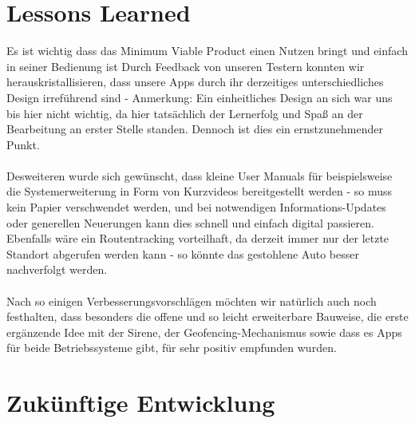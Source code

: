 \section{Lessons Learned}
Es ist wichtig dass das Minimum Viable Product einen Nutzen bringt und einfach in seiner Bedienung ist\cite{Full2022}
Durch Feedback von unseren Testern konnten wir herauskristallisieren, dass unsere Apps durch ihr derzeitiges unterschiedliches Design irreführend sind - Anmerkung: Ein einheitliches Design an sich war uns bis hier nicht wichtig, da hier tatsächlich der Lernerfolg und Spaß an der Bearbeitung an erster Stelle standen. Dennoch ist dies ein ernstzunehmender Punkt.
\\
\\
Desweiteren wurde sich gewünscht, dass kleine User Manuals für beispielsweise die Systemerweiterung in Form von Kurzvideos bereitgestellt werden - so muss kein Papier verschwendet werden, und bei notwendigen Informations-Updates oder generellen Neuerungen kann dies schnell und einfach digital passieren. Ebenfalls wäre ein Routentracking vorteilhaft, da derzeit immer nur der letzte Standort abgerufen werden kann - so könnte das gestohlene Auto besser nachverfolgt werden. 
\\
\\
Nach so einigen Verbesserungsvorschlägen möchten wir natürlich auch noch festhalten, dass besonders die offene und so leicht erweiterbare Bauweise, die erste ergänzende Idee mit der Sirene, der Geofencing-Mechanismus sowie dass es Apps für beide Betriebssysteme gibt, für sehr positiv empfunden wurden.




\section{Zukünftige Entwicklung}

